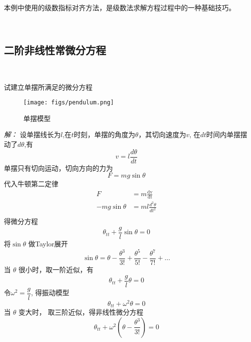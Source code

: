 ~~\\
\begin{hint}
	本例中使用的级数指标对齐方法，是级数法求解方程过程中的一种基础技巧。
\end{hint} ~\\

\subsection{二阶非线性常微分方程} ~\\
\begin{example}
 试建立单摆所满足的微分方程
 \begin{figure}[h]
	\centering
	\texttt{[image: figs/pendulum.png]}
	\caption{单摆模型}
 \end{figure}
\end{example}
 \emph{解：}
	设单摆线长为$l$,在$t$时刻，单摆的角度为$\theta$，其切向速度为$v$, 在$dt$时间内单摆摆动了$d\theta$,有
	$$
	v=l \frac{d\theta}{dt}
	$$
	单摆只有切向运动，切向方向的力为
	$$
	F=mg \sin\theta 
	$$
代入牛顿第二定律
$$
\begin{aligned}
	F&=m\frac{\mathrm{d v}}{\mathrm{dt}}\\ 
	-mg \sin\theta  &= m l \frac{d^2\theta }{dt^2} \\
\end{aligned}
$$
得微分方程
$$ \theta _{tt} + \frac{g}{l} \sin \theta =0 $$
将$\sin \theta$ 做Taylor展开
$$
\sin \theta=\theta-\frac{\theta^3}{3 !}+\frac{\theta^5}{5 !}-\frac{\theta^7}{7 !}+\ldots
$$ 
当 $\theta$ 很小时，取一阶近似，有
$$ \theta _{tt} + \frac{g}{l} \theta =0 $$
令$\omega ^2 = \dfrac{g}{l}$, 得振动模型
$$ \theta _{tt} + \omega ^2 \theta =0 $$
当 $\theta$ 变大时， 取三阶近似，得非线性微分方程
$$ \theta _{tt} + \omega ^2 (\theta - \frac{\theta^3}{3 !}) =0 $$
~~\\ 
